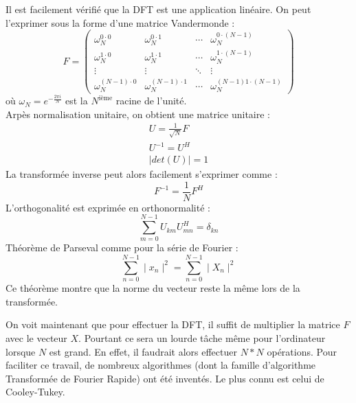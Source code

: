 \documentclass{report}
\begin{document}
		Il est facilement vérifié que la DFT est une application linéaire. On peut l'exprimer sous la forme d'une matrice Vandermonde :
		\begin{displaymath}
			F = \begin{pmatrix}
					\omega_N^{0\cdot0}	&	\omega_N^{0\cdot1}	&	\cdots	&	\omega_N^{0\cdot(N-1)}\\
					\omega_N^{1\cdot0}	&	\omega_N^{1\cdot1}	&	\cdots	&	\omega_N^{1\cdot(N-1)}\\
					\vdots				&	\vdots				&	\ddots	&	\vdots\\
					\omega_N^{(N-1)\cdot0}	&	\omega_N^{(N-1)\cdot1}	&	\cdots	&	\omega_N^{(N-1)1\cdot(N-1)}
				\end{pmatrix}
		\end{displaymath}
		où 
		\begin{math}
			\omega_N 	=	e^{-\frac{2\pi i}{N}}
		\end{math} est la $N^\text{ième}$ racine de l'unité.\\
		Arpès normalisation unitaire, on obtient une matrice unitaire :
		\begin{align*}
			U 					=	\frac{1}{\sqrt{N}}F \\
			U^{-1}				=	U^H \\
			\mid det(U)\mid 	=	1 
		\end{align*}
		La transformée inverse peut alors facilement s'exprimer comme :
		\begin{displaymath}
			F^{-1}=\frac{1}{N}F^{H}
		\end{displaymath}
		L'orthogonalité est exprimée en orthonormalité :
		\begin{displaymath}
			\sum_{m=0}^{N-1}U_{km}U_{mn}^H=\delta_{kn}
		\end{displaymath} 
		Théorème de Parseval comme pour la série de Fourier :
		\begin{displaymath}
			\sum_{n=0}^{N-1}\mid x_n\mid ^{2}=\sum_{n=0}^{N-1}\mid X_n\mid ^{2}
		\end{displaymath}
		Ce théorème montre que la norme du vecteur reste la même lors de la transformée.

		On voit maintenant que pour effectuer la DFT, il suffit de multiplier la matrice \begin{math}F\end{math} avec le vecteur \begin{math}X\end{math}. Pourtant ce sera un lourde tâche même pour l'ordinateur lorsque \begin{math}N\end{math} est grand. En effet, il faudrait alors effectuer $N*N$ opérations. Pour faciliter ce travail, de nombreux algorithmes (dont la famille d'algorithme Transformée de Fourier Rapide) ont été inventés. Le plus connu est celui de Cooley-Tukey.
\end{document}
